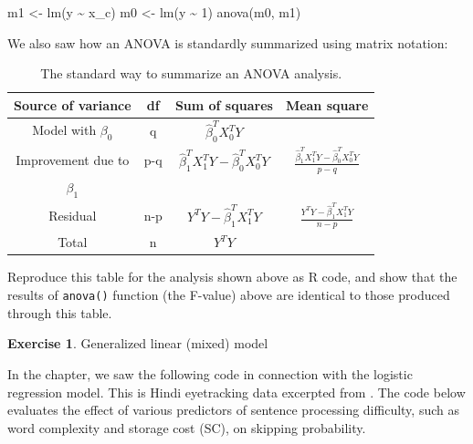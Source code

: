 \documentclass[
  12pt,
]{krantz}
\newenvironment{Shaded}{\begin{snugshade}}{\end{snugshade}}
\newcommand{\DecValTok}[1]{\textcolor[rgb]{0.00,0.00,0.81}{#1}}
\newcommand{\FunctionTok}[1]{\textcolor[rgb]{0.00,0.00,0.00}{#1}}
\newcommand{\NormalTok}[1]{#1}
\newcommand{\OtherTok}[1]{\textcolor[rgb]{0.56,0.35,0.01}{#1}}
\newcommand{\SpecialCharTok}[1]{\textcolor[rgb]{0.00,0.00,0.00}{#1}}
\theoremstyle{definition}
\theoremstyle{definition}
\theoremstyle{definition}
\newtheorem{exercise}{Exercise}[chapter]
\theoremstyle{definition}
\theoremstyle{remark}
\begin{document}
\begin{Shaded}
\begin{Highlighting}[]
\NormalTok{m1 }\OtherTok{\textless{}{-}} \FunctionTok{lm}\NormalTok{(y }\SpecialCharTok{\textasciitilde{}}\NormalTok{ x\_c)}
\NormalTok{m0 }\OtherTok{\textless{}{-}} \FunctionTok{lm}\NormalTok{(y }\SpecialCharTok{\textasciitilde{}} \DecValTok{1}\NormalTok{)}
\FunctionTok{anova}\NormalTok{(m0, m1)}
\end{Highlighting}
\end{Shaded}

We also saw how an ANOVA is standardly summarized using matrix notation:

\begin{table}[!htbp]
\caption{The standard way to summarize an ANOVA analysis.}
\begin{center}
\begin{tabular}{|c|c|c|c|}
\hline
Source of variance & df & Sum of squares & Mean square\\
\hline
Model with $\beta_0$ & q & $\hat\beta_0^T X_0^T Y$ & \\
Improvement due to & p-q & $\hat \beta_1^T X_1^T Y - \hat \beta_0^T X_0^T Y$ & $\frac{\hat \beta_1^T X_1^T Y - \hat \beta_0^T X_0^T Y}{p-q}$\\
$\beta_1$ & & & \\
Residual & n-p & $Y^T Y - \hat \beta_1^T X_1^TY$  & $\frac{Y^T Y - \hat \beta_1^T X_1^TY}{n-p}$\\
\hline
Total & n & $Y^T Y$ & \\
\hline
\end{tabular}
\end{center}
\label{tab:anovasummary2}
\end{table}

Reproduce this table for the analysis shown above as R code, and show that the results of \texttt{anova()} function (the F-value) above are identical to those produced through this table.

\begin{exercise}
\protect\hypertarget{exr:GLMM}{}\label{exr:GLMM}Generalized linear (mixed) model
\end{exercise}

In the chapter, we saw the following code in connection with the logistic regression model. This is Hindi eyetracking data excerpted from \citet{HusainVasishthNarayanan2015}. The code below evaluates the effect of various predictors of sentence processing difficulty, such as word complexity and storage cost (SC), on skipping probability.
\end{document}
